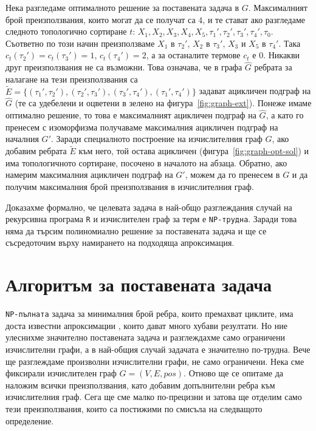 \documentclass[12pt,twoside,a4paper]{article}
\begin{document}
	Нека разгледаме оптималното решение за поставената задача в $G$. Максималният брой преизползвания, които могат да се получат са $4$, и те стават ако разгледаме следното топологично сортиране $t$: $X_1,X_2,X_3,X_4,X_5,\tau_1',\tau_2',\tau_3',\tau_4',\tau_0$. Съответно по този начин преизползваме $X_1$ в $\tau_2'$, $X_2$ в $\tau_3'$, $X_3$ и $X_5$ в $\tau_4'$. Така $c_t(\tau_2')=c_t(\tau_3')=1$, $c_t(\tau_4')=2$, а за останалите термове $c_t$ е $0$. Никакви друг преизползвания не са възможни. Това означава, че в графа $\hat{G}$ ребрата за налагане на тези преизползвания са $\tilde{E}=\{(\tau_1',\tau_2'),(\tau_2',\tau_3'),(\tau_3',\tau_4'),(\tau_1',\tau_4')\}$ задават ацикличен подграф на $\hat{G}$ (те са удебелени и оцветени в зелено на фигура~\ref{fig:graph-ext}). Понеже имаме оптимално решение, то това е максималният ацикличен подграф на $\hat{G}$, а като го пренесем с изоморфизма получаваме максималния ацикличен подграф на началния $G'$. Заради специалното построение на изчислителния граф $G$, ако добавим ребрата $\tilde{E}$ към него, той остава ацикличен (фигура~\ref{fig:graph-opt-sol}) и има топологичното сортиране, посочено в началото на абзаца. Обратно, ако намерим максималния ацикличен подграф на $G'$, можем да го пренесем в $G$ и да получим максималния брой преизползвания в изчислителния граф.
	\begin{center}
		\vspace{-0.2cm}
		
		\label{fig:graph-opt-sol}
	\end{center}
	\finexample
	
	Доказахме формално, че целевата задача в най-общо разглеждания случай на рекурсивна програма \texttt{R} и изчислителен граф за терм е \texttt{NP-трудна}. Заради това няма да търсим полиномиално решение за поставената задача и ще се съсредоточим върху намирането на подходяща апроксимация.
	
	\section{Алгоритъм за поставената задача}
	\texttt{NP-пълната} задача за минималния брой ребра, които премахват циклите, има доста известни апроксимации \cite{feedback-arc-set-approx}, които дават много хубави резултати. Но ние улеснихме значително поставената задача и разглеждахме само ограничени изчислителни графи, а в най-общия случай задачата е значително по-трудна. Вече ще разглеждаме произволни изчислителни графи, не само ограничени. Нека сме фиксирали изчислителен граф $G=(V,E,pos)$. Отново ще се опитаме да наложим всички преизползвания, като добавим допълнителни ребра към изчислителния граф. Сега ще сме малко по-прецизни и затова ще отделим само тези преизползвания, които са постижими по смисъла на следващото определение.
	
\end{document}
